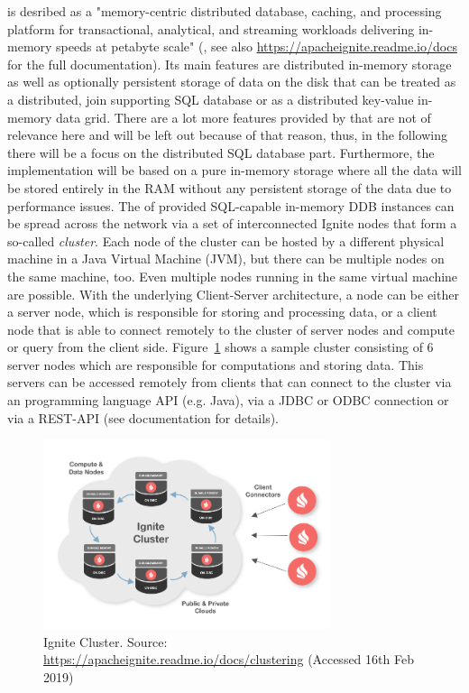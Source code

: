  is desribed as a "memory-centric distributed database, caching, and processing platform for transactional, analytical, and streaming
workloads delivering in-memory speeds at petabyte scale" (, see also \url{https://apacheignite.readme.io/docs} for the full
documentation).
Its main features are distributed in-memory storage as well as optionally persistent storage of data on the disk that can be treated as a distributed, join
supporting SQL database or as a distributed key-value in-memory data grid. There are a lot more features provided by  that are not of
relevance here and will be left out because of that reason, thus, in the following there will be a focus on the distributed SQL database part.
Furthermore, the implementation will be based on a pure in-memory storage where all the data will be stored entirely in the RAM without any persistent 
storage of the data due to performance issues. The of  provided SQL-capable in-memory DDB instances can be spread across the network 
via a set of interconnected Ignite nodes that form a so-called \emph{cluster}. Each node of the cluster can be hosted by a different physical machine 
in a Java Virtual Machine (JVM), but there can be multiple nodes on the same machine, too. Even multiple nodes running in the same virtual machine are
possible. With the underlying Client-Server architecture, a node can be either a server node, which is responsible for storing and processing data, or a
client node that is able to connect remotely to the cluster of server nodes and compute or query from the client side. Figure~\ref{fig:ign_cluster} shows
a sample cluster consisting of 6 server nodes which are responsible for computations and storing data. This servers can be accessed remotely from clients
that can connect to the cluster via an programming language API (e.g. Java), via a JDBC or ODBC connection or via a REST-API (see documentation for
details). 

\begin{figure}[h]
    \centering
    \includegraphics[width=0.75\textwidth,keepaspectratio=true]{img/9287d3c-ignite-deploy.png}
    \caption{Ignite Cluster. Source: \protect\url{https://apacheignite.readme.io/docs/clustering} (Accessed 16th Feb 2019)}
    \label{fig:ign_cluster}
\end{figure}


